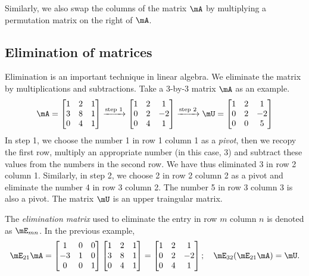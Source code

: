 \documentclass[11pt]{article}
\theoremstyle{plain}
\theoremstyle{definition}
\begin{document}
\vspace{.2cm}
Similarly, we also swap the columns of the matrix $\mA$ by multiplying a permutation matrix on the right of $\mA$.

\subsection{Elimination of matrices}
Elimination is an important technique in linear algebra. We eliminate the matrix by multiplications and subtractions. Take a 3-by-3 matrix $\mA$ as an example.
\begin{align}
	\mA = \begin{bmatrix}
		1 &2&1\\3 & 8 & 1\\ 0 & 4 & 1 
	\end{bmatrix}
	\xrightarrow{\text{step 1}} \begin{bmatrix}
		1 &2&1\\0 & 2 & -2\\ 0 & 4 & 1 
	\end{bmatrix}
	\xrightarrow{\text{step 2}} \mU =  \begin{bmatrix}
		1 &2&1\\0 & 2 & -2\\ 0 & 0 & 5
	\end{bmatrix}
\end{align}
In step 1, we choose the number 1 in row 1 column 1 as a \textit{pivot}, then we recopy the first row, multiply an appropriate number (in this case, 3) and subtract these values from the numbers in the second row. We have thus eliminated 3 in row 2 column 1. Similarly, in step 2, we choose 2 in row 2 column 2 as a pivot and eliminate the number 4 in row 3 column 2.  The number 5 in row 3 column 3 is also a pivot. The matrix $\mU$ is an upper traingular matrix.

\vspace{.2cm}
The \textit{elimination matrix} used to eliminate the entry in row $m$ column $n$ is denoted as $\mE_{mn}$. In the previous example, 
\begin{align}
\mE_{21} \mA = 
\begin{bmatrix}
		1 &0&0\\-3 & 1 & 0\\ 0 & 0 & 1 
	\end{bmatrix}
	\begin{bmatrix}
		1 &2&1\\3 & 8 & 1\\ 0 & 4 & 1 
	\end{bmatrix} = \begin{bmatrix}
		1 &2&1\\0 & 2 & -2\\ 0 & 4 & 1 
	\end{bmatrix};\quad \mE_{32} (\mE_{21} \mA) = \mU.
\end{align}
\end{document}
